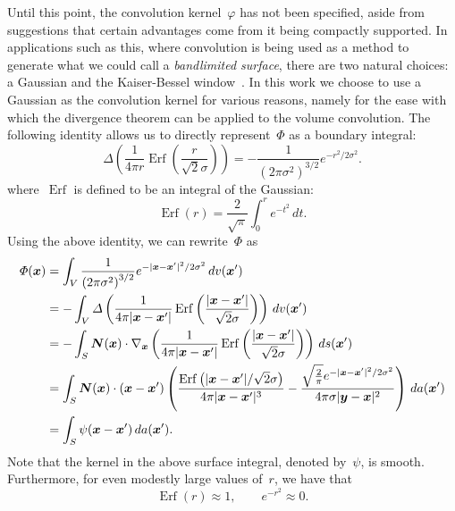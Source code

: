 \documentclass[11pt]{article}
\numberwithin{equation}{section}
\newcommand{\vct}{\vectorsym}
\newcommand{\lp}{\left(}
\newcommand{\rp}{\right)}
\DeclareMathOperator\erf{Erf}
\newcommand\bx{\vct{x}}
\newcommand\by{\vct{y}}
\renewcommand{\phi}{\varphi}
\begin{document}
Until this point, the convolution kernel~$\phi$ has not been
specified, aside from suggestions that certain advantages come from it
being compactly supported. In applications such as this, where
convolution is being used as a method to generate what we could call a
\emph{bandlimited surface}, there are two natural choices: a Gaussian
and the Kaiser-Bessel window~\cite{barnett2018}. In this work we
choose to use a Gaussian as the convolution kernel for various
reasons, namely for the ease with which the divergence theorem can be
applied to the volume convolution. The following identity allows us to
directly represent~$\Phi$ as a boundary integral: 
\begin{equation}
  \Delta \lp \frac{1}{4\pi r} \erf \lp \frac{r}{\sqrt{2}\sigma} \rp
  \rp = - \frac{1}{\lp 2\pi \sigma^2 \rp^{3/2}} e^{-r^2/2\sigma^2}.
\end{equation}
where~$\erf$ is defined to be an integral of the Gaussian:
\begin{equation}
\erf(r) = \frac{2}{\sqrt{\pi}} \int^r_0 e^{-t^2} \, dt.
\end{equation}
Using the above identity, we can rewrite~$\Phi$ as
\begin{equation}\label{eq:surf}
  \begin{aligned}
    \Phi(\vct{x}) &= \int_V \frac{1}{\lp 2\pi \sigma^2 \rp^{3/2}}
    e^{-|\vct{x}-\vct{x}'|^2/2\sigma^2} \, dv(\vct{x}') \\
    &= - \int_V \Delta \lp \frac{1}{4\pi |\vct{x}-\vct{x}'|}
    \erf \lp \frac{|\vct{x} - \vct{x}'|}{\sqrt{2}\sigma} \rp
    \rp \, dv(\vct{x}') \\
    &= - \int_S \vct{N}(\bx) \cdot \nabla_{\vct{x}}
     \lp \frac{1}{4\pi |\vct{x}-\vct{x}'|}
    \erf \lp \frac{|\vct{x} - \vct{x}'|}{\sqrt{2}\sigma} \rp
    \rp \, ds(\vct{x}') \\
    &=\int_S  \vct{N}(\vct{x}) \cdot \lp \vct{x} -\vct{x}' \rp \lp
    \frac{\erf \lp |\bx-\bx'|/ \sqrt{2}\sigma \rp
    }{4\pi|\bx-\bx'|^3}
    -\frac{\sqrt{\frac{2}{\pi}}e^{-|\bx-\bx'|^2/2\sigma^2}}{4\pi\sigma|\by-\bx|^2}
    \rp \, da(\bx') \\
    &= \int_S \psi(\bx-\bx') \, da(\bx').
  \end{aligned}
\end{equation}
Note that the kernel in the above surface integral, denoted by~$\psi$,
is smooth. Furthermore, for even modestly large values of~$r$, we have
that
\begin{equation}
  \erf(r) \approx 1, \qquad e^{-r^2} \approx 0.
\end{equation}
\end{document}
